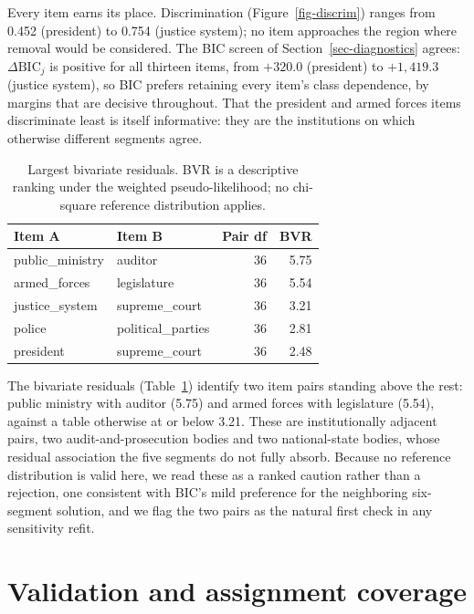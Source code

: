 \documentclass[
  12pt]{article}
\begin{document}
Every item earns its place. Discrimination (Figure~\ref{fig-discrim})
ranges from 0.452 (president) to 0.754 (justice system); no item
approaches the region where removal would be considered. The BIC screen
of Section~\ref{sec-diagnostics} agrees: \(\Delta\mathrm{BIC}_j\) is
positive for all thirteen items, from \(+320.0\) (president) to
\(+1{,}419.3\) (justice system), so BIC prefers retaining every item's
class dependence, by margins that are decisive throughout. That the
president and armed forces items discriminate least is itself
informative: they are the institutions on which otherwise different
segments agree.

\begin{longtable}[]{@{}llrr@{}}

\caption{\label{tbl-bvr}Largest bivariate residuals. BVR is a
descriptive ranking under the weighted pseudo-likelihood; no chi-square
reference distribution applies.}

\tabularnewline

\toprule\noalign{}
Item A & Item B & Pair df & BVR \\
\midrule\noalign{}
\endhead
\bottomrule\noalign{}
\endlastfoot
public\_ministry & auditor & 36 & 5.75 \\
armed\_forces & legislature & 36 & 5.54 \\
justice\_system & supreme\_court & 36 & 3.21 \\
police & political\_parties & 36 & 2.81 \\
president & supreme\_court & 36 & 2.48 \\

\end{longtable}

The bivariate residuals (Table~\ref{tbl-bvr}) identify two item pairs
standing above the rest: public ministry with auditor (5.75) and armed
forces with legislature (5.54), against a table otherwise at or below
3.21. These are institutionally adjacent pairs, two
audit-and-prosecution bodies and two national-state bodies, whose
residual association the five segments do not fully absorb. Because no
reference distribution is valid here, we read these as a ranked caution
rather than a rejection, one consistent with BIC's mild preference for
the neighboring six-segment solution, and we flag the two pairs as the
natural first check in any sensitivity refit.

\section{Validation and assignment
coverage}\label{sec-results-validation}
\end{document}
